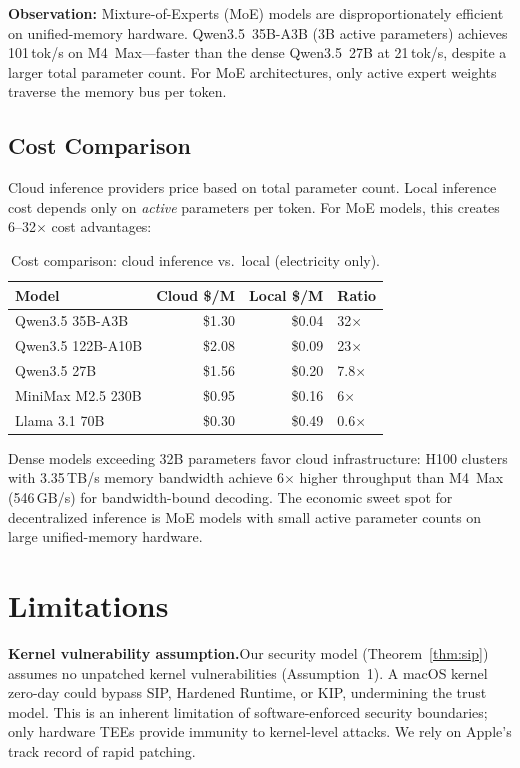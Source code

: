 \documentclass[10pt,twocolumn,letterpaper]{article}
\begin{document}
\textbf{Observation:} Mixture-of-Experts (MoE) models are disproportionately efficient on unified-memory hardware. Qwen3.5~35B-A3B (3B active parameters) achieves 101\,tok/s on M4~Max---faster than the dense Qwen3.5~27B at 21\,tok/s, despite a larger total parameter count. For MoE architectures, only active expert weights traverse the memory bus per token.

\subsection{Cost Comparison}

Cloud inference providers price based on total parameter count. Local inference cost depends only on \emph{active} parameters per token. For MoE models, this creates 6--32$\times$ cost advantages:

\begin{table}[h]
\centering
\caption{Cost comparison: cloud inference vs.\ local (electricity only).}
\vspace{4pt}
\small
\begin{tabular}{@{}lrrl@{}}
\toprule
\textbf{Model} & \textbf{Cloud \$/M} & \textbf{Local \$/M} & \textbf{Ratio} \\
\midrule
Qwen3.5 35B-A3B & \$1.30 & \$0.04 & 32$\times$ \\
Qwen3.5 122B-A10B & \$2.08 & \$0.09 & 23$\times$ \\
Qwen3.5 27B & \$1.56 & \$0.20 & 7.8$\times$ \\
MiniMax M2.5 230B & \$0.95 & \$0.16 & 6$\times$ \\
Llama 3.1 70B & \$0.30 & \$0.49 & 0.6$\times$ \\
\bottomrule
\end{tabular}
\end{table}

Dense models exceeding 32B parameters favor cloud infrastructure: H100 clusters with 3.35\,TB/s memory bandwidth achieve 6$\times$ higher throughput than M4~Max (546\,GB/s) for bandwidth-bound decoding. The economic sweet spot for decentralized inference is MoE models with small active parameter counts on large unified-memory hardware.

\section{Limitations}
\label{sec:limitations}

\textbf{Kernel vulnerability assumption.}\quad Our security model (Theorem~\ref{thm:sip}) assumes no unpatched kernel vulnerabilities (Assumption~1). A macOS kernel zero-day could bypass SIP, Hardened Runtime, or KIP, undermining the trust model. This is an inherent limitation of software-enforced security boundaries; only hardware TEEs provide immunity to kernel-level attacks. We rely on Apple's track record of rapid patching.
\end{document}
